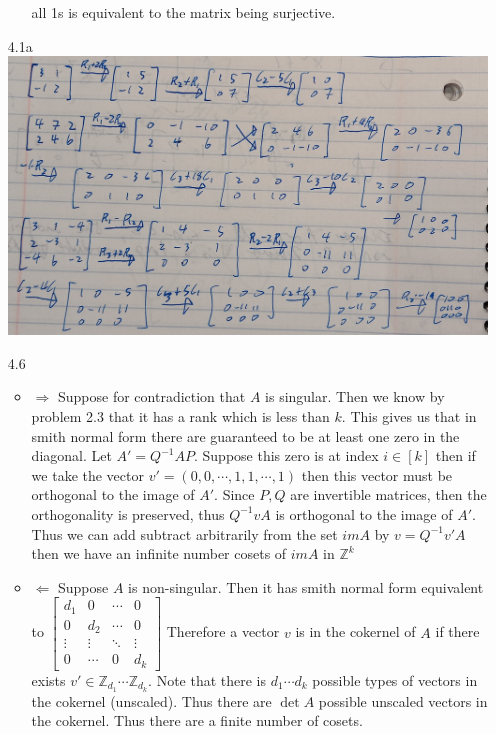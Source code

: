 \documentclass[12pt, letterpaper]{article}
\newcommand{\Z}{\mathbb{Z}}
\begin{document}
\begin{enumerate}
\begin{enumerate}
		all 1s is equivalent to the matrix being surjective.    
	\end{enumerate}
	\item[4.1a]
	\includegraphics[scale=0.25]{20231206_154927.jpg}
	\item[4.6] 
	\begin{itemize}
		\item $\Rightarrow$ Suppose for contradiction that $A$ is singular.
		Then we know by problem 2.3 that it has a rank which is less than $k$.  
		This gives us that in smith normal form there are guaranteed to be at 
		least one zero in the diagonal.  Let $A' = Q^{-1}A P$.  Suppose this zero
		is at index $i \in [k]$ then if we take the vector $v' = (0,0,\cdots,1,1,\cdots, 1)$ then this vector must be orthogonal to the image of $A'$.  Since $P,Q$ 
		are invertible matrices, then the orthogonality is preserved, thus 
		$Q^{-1}vA$ is orthogonal to the image of $A'$.  Thus we can add subtract arbitrarily from the set $im A$ by $v = Q^{-1}v'A$ then we have an infinite number  cosets of $im A$ in $\Z^k$
		\item $\Leftarrow$ Suppose $A$ is non-singular.  Then it has smith normal form equivalent to $\begin{bmatrix}
		d_1 & 0 & \cdots & 0\\
		0 & d_2 & \cdots &0\\
		\vdots & \vdots & \ddots & \vdots\\
		0 & \cdots &  0 & d_k 
		\end{bmatrix}$
		Therefore a vector $v$ is in the cokernel of $A$ if there exists 
		$v' \in \Z_{d_1}\cdots \Z_{d_k}$.  Note that there is $d_1 \cdots d_k$ possible types of vectors in the cokernel (unscaled).  Thus there are $\det A$ 
		possible unscaled vectors in the cokernel.  Thus there are a finite number 
		of cosets.  

\end{itemize}
\end{enumerate}
\end{document}
